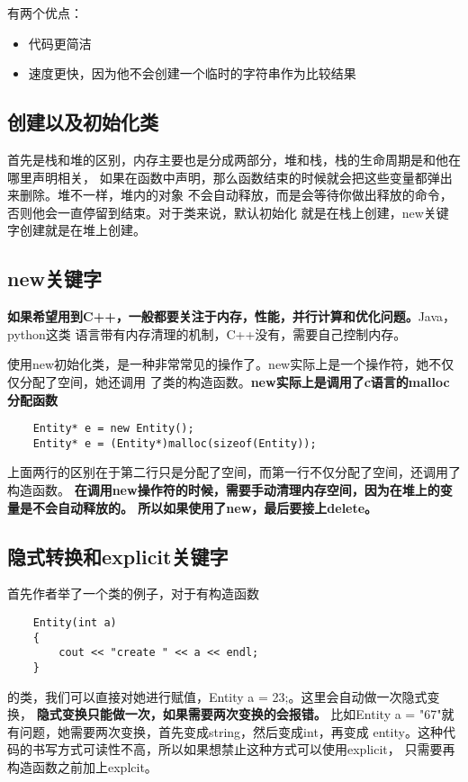 \documentclass{article}
\begin{document}
\begin{sloppypar}
有两个优点：
\begin{itemize}
	\item 代码更简洁
	\item 速度更快，因为他不会创建一个临时的字符串作为比较结果
\end{itemize}

\subsection{创建以及初始化类}
首先是栈和堆的区别，内存主要也是分成两部分，堆和栈，栈的生命周期是和他在哪里声明相关，
如果在函数中声明，那么函数结束的时候就会把这些变量都弹出来删除。堆不一样，堆内的对象
不会自动释放，而是会等待你做出释放的命令，否则他会一直停留到结束。对于类来说，默认初始化
就是在栈上创建，new关键字创建就是在堆上创建。

\subsection{new关键字}
\textbf{如果希望用到C++，一般都要关注于内存，性能，并行计算和优化问题。}Java，python这类
语言带有内存清理的机制，C++没有，需要自己控制内存。

使用new初始化类，是一种非常常见的操作了。new实际上是一个操作符，她不仅仅分配了空间，她还调用
了类的构造函数。\textbf{new实际上是调用了c语言的malloc分配函数}
\begin{lstlisting}
	Entity* e = new Entity();
	Entity* e = (Entity*)malloc(sizeof(Entity));
\end{lstlisting}
上面两行的区别在于第二行只是分配了空间，而第一行不仅分配了空间，还调用了构造函数。
\textbf{在调用new操作符的时候，需要手动清理内存空间，因为在堆上的变量是不会自动释放的。
所以如果使用了new，最后要接上delete。}

\subsection{隐式转换和explicit关键字}
首先作者举了一个类的例子，对于有构造函数
\begin{lstlisting}
	Entity(int a)
	{
		cout << "create " << a << endl;
	}

\end{lstlisting}
的类，我们可以直接对她进行赋值，Entity a = 23;。这里会自动做一次隐式变换，
\textbf{隐式变换只能做一次，如果需要两次变换的会报错。}
比如Entity a = "67"就有问题，她需要两次变换，首先变成string，然后变成int，再变成
entity。这种代码的书写方式可读性不高，所以如果想禁止这种方式可以使用explicit，
只需要再构造函数之前加上explcit。


\end{sloppypar}
\end{document}
